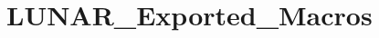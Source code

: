 \hypertarget{group___l_u_n_a_r___exported___macros}{}\section{L\+U\+N\+A\+R\+\_\+\+Exported\+\_\+\+Macros}
\label{group___l_u_n_a_r___exported___macros}
